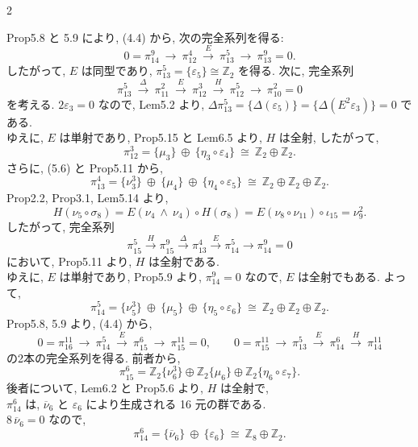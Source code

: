 \documentclass[10pt, leqno]{ltjsarticle}
\newcommand{\ov}[1]{\overline{#1}}
\newcommand{\gen}[1]{\{#1\}}       %
\newcommand{\pit}[2]{\pi_{#1}^{#2}}
\numberwithin{equation}{section}
\theoremstyle{plain}
\theoremstyle{definition}
\theoremstyle{remark}
\begin{document}
\begin{paracol}{2}

Prop5.8 と 5.9 により, (4.4) から, 次の完全系列を得る:
\[
0 = \pit{14}{9}\ \xrightarrow{}\ \pit{12}{4}
\ \xrightarrow{\ E\ }\ \pit{13}{5}\ \longrightarrow\ \pit{13}{9} = 0 .
\]
したがって, \(E\) は同型であり, 
\(\pit{13}{5}=\gen{\varepsilon_{5}}\cong\mathbb Z_{2}\) を得る. 
次に, 完全系列
\[
\pit{13}{5}\ \xrightarrow{\ \Delta\ }\ \pit{11}{2}\ \xrightarrow{\ E\ }\ 
\pit{12}{3}\ \xrightarrow{\ H\ }\ \pit{12}{5}\ \longrightarrow\ \pit{10}{2}=0
\]
を考える. 
\(2\varepsilon_{3}=0\) なので, 
Lem5.2 より,
\(\Delta\pit{13}{5}
=\gen{\Delta(\varepsilon_{5})}
=\gen{\Delta(E^{2}\varepsilon_{3})}=0\)
である. \\
ゆえに, \(E\) は単射であり, 
Prop5.15 と Lem6.5 より, \(H\) は全射, したがって,
\[
\pit{12}{3}=\gen{\mu_{3}}\ \oplus\ \gen{\eta_{3}\circ \varepsilon_{4}}
\ \cong\ \mathbb Z_{2}\oplus\mathbb Z_{2}.
\]
さらに, (5.6) と Prop5.11 から,
\[
\pit{13}{4}
=\gen{\nu_{3}^{3}}\ \oplus\ \gen{\mu_{4}}\ \oplus\ \gen{\eta_{4}\circ \varepsilon_{5}}
\ \cong\ \mathbb Z_{2}\oplus\mathbb Z_{2}\oplus\mathbb Z_{2}.
\]
Prop2.2,  Prop3.1,  Lem5.14 より,
\[
H(\nu_{5}\circ \sigma_{8})
=E(\nu_{4}\ \wedge\ \nu_{4})\circ H(\sigma_{8})
=E(\nu_{8}\circ \nu_{11})\circ \iota_{15}
=\nu_{9}^{2}.
\]
したがって, 完全系列
\[
\pit{15}{5}\xrightarrow{\ H\ }\pit{15}{9}\xrightarrow{\ \Delta\ }\pit{13}{4}
\xrightarrow{\ E\ }\pit{14}{5}\longrightarrow\pit{14}{9}=0
\]
において,  Prop5.11 より, \(H\) は全射である. \\
ゆえに, \(E\) は単射であり, 
Prop5.9 より, \(\pit{14}{9}=0\) なので, \(E\) は全射でもある. よって,
\[
\pit{14}{5}
=\gen{\nu_{5}^{3}}\ \oplus\ \gen{\mu_{5}}\ \oplus\ \gen{\eta_{5}\circ \varepsilon_{6}}
\ \cong\ \mathbb Z_{2}\oplus\mathbb Z_{2}\oplus\mathbb Z_{2}.
\]
Prop5.8, 5.9 より,  (4.4) から,
\[
0 = \pit{16}{11}\ \longrightarrow\ \pit{14}{5}\ 
\xrightarrow{\ E\ }\ \pit{15}{6}\ \longrightarrow\ \pit{15}{11} = 0,
\qquad
0 = \pit{15}{11}\ \longrightarrow\ \pit{13}{5}\ 
\xrightarrow{\ E\ }\ \pit{14}{6}\ \xrightarrow{\ H\ }\ \pit{14}{11}
\]
の2本の完全系列を得る. 前者から,
\[
\pit{15}{6} = \mathbb{Z}_2\gen{\nu_6^3}
\oplus\mathbb{Z}_2\gen{\mu_6}
\oplus\mathbb{Z}_2\gen{\eta_6\circ\varepsilon_7} .
\]
後者について,  Lem6.2 と Prop5.6 より,
\(H\) は全射で, \\
\(\pit{14}{6}\) は,
\(\ov{\nu}_{6}\) と \(\varepsilon_{6}\) により生成される 16 元の群である. \\
\(8\,\ov{\nu}_{6}=0\) なので,
\[
\pit{14}{6}=\gen{\ov{\nu}_{6}}\ \oplus\ \gen{\varepsilon_{6}}
\ \cong\ \mathbb Z_{8}\oplus\mathbb Z_{2} .
\]


\end{paracol}
\end{document}
